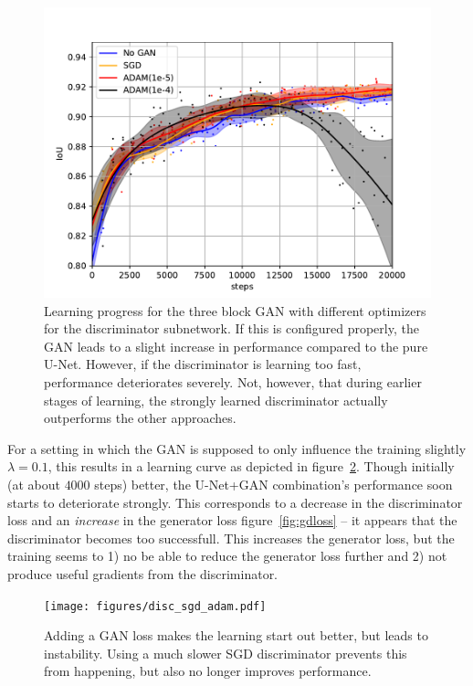 \documentclass[aps,prl,twocolumn,groupedaddress,amsmath,amssymb]{revtex4-1}
\begin{document}
    \begin{figure}[tbp]
        \begin{center}
        \includegraphics[width=\linewidth]{figures/gan_3_opt.pdf}
        \end{center}
        \caption{Learning progress for the three block GAN with different optimizers for the
        discriminator subnetwork. If this is configured properly, the GAN leads to a slight increase
        in performance compared to the pure U-Net. However, if the discriminator is learning too 
        fast, performance deteriorates severely. Not, however, that during earlier stages of learning,
        the strongly learned discriminator actually outperforms the other approaches.}
        \label{fig:gan_3_opt}
    \end{figure}

    For a setting in which the GAN is
    supposed to only influence the training slightly $\lambda=0.1$, this results in a learning curve
    as depicted in figure~\ref{fig:gan_adam}. Though initially (at about $4000$ steps) better, the
    U-Net+GAN combination's performance soon starts to deteriorate strongly. This corresponds to a
    decrease in the discriminator loss and an \emph{increase} in the
    generator loss figure~\ref{fig:gdloss} -- it appears that the discriminator becomes too
    successfull. This  increases the generator loss, but the training seems to 1) no be able to
    reduce the generator  loss further and 2) not produce useful gradients from the discriminator.

    \begin{figure}[tbp]
        \begin{center}
        \texttt{[image: figures/disc\_sgd\_adam.pdf]}
        \end{center}
        \caption{Adding a GAN loss makes the learning start out better, but leads to instability. 
        Using a much slower SGD discriminator prevents this from happening, but also no longer 
        improves performance.}
        \label{fig:gan_adam}
    \end{figure}
\end{document}
